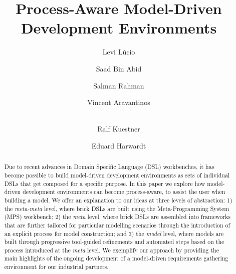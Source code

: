 \documentclass{llncs}
\begin{document}
%
\frontmatter          %

\mainmatter              %
%
\title{Process-Aware Model-Driven Development Environments}
%
\titlerunning{}  %
%
\author{Levi L\'ucio \and Saad Bin Abid
 \and Salman Rahman \and Vincent
Aravantinos\and\\ Ralf Kuestner\and Eduard Harwardt}
%
\authorrunning{} %
%
\tocauthor{}
%

\maketitle            
\begin{abstract}
\vspace{-.7cm}
Due to recent advances in Domain Specific Language (DSL) workbenches, it has
become possible to build model-driven development environments as sets of
individual DSLs that get composed for a specific purpose.
In this paper we explore how model-driven development environments can
become process-aware, to assist the user when building a model.
We offer an explanation to our ideas at three levels of abstraction:
1) the \emph{meta-meta} level, where brick DSLs are built using the
Meta-Programming System (MPS) workbench; 2) the \emph{meta} level, where brick
DSLs are assembled into frameworks that are further tailored for
particular modelling scenarios through the introduction of an explicit process
for model construction; and 3) the \emph{model} level, where
models are built through progressive tool-guided refinements and automated
steps based on the process introduced at the \emph{meta} level.
We exemplify our approach by providing the main highlights of the ongoing
development of a model-driven requirements gathering environment for our
industrial partners.
\vspace{-.7cm}
\end{abstract} 
\end{document}
